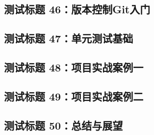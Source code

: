 \subsection{测试标题 46：版本控制Git入门}
\subsection{测试标题 47：单元测试基础}
\subsection{测试标题 48：项目实战案例一}
\subsection{测试标题 49：项目实战案例二}
\subsection{测试标题 50：总结与展望}

\newpage %